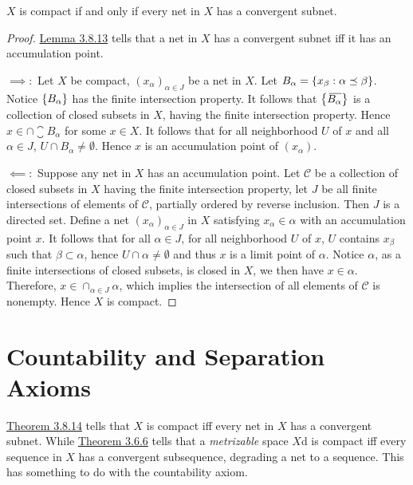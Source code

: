 \documentclass[12pt,a4paper]{article}
\begin{document}
    \begin{thm}\label{3.8.14}
        $X$ is compact if and only if every net in $X$ has a convergent subnet.
    \end{thm}
    \begin{proof}
        \hyperref[3.8.13]{Lemma 3.8.13} tells that a net in $X$ has a convergent subnet iff it has an accumulation point.
        
        $\implies:$ Let $X$ be compact, $(x_\alpha)_{\alpha\in J}$ be a net in $X$. Let $B_\alpha=\left\{x_\beta:\alpha\preceq\beta\right\}$. Notice $\left\{B_\alpha\right\}$ has the finite intersection property. It follows that $\left\{{}\mkern3mu\overline{\mkern-3muB_\alpha}\right\}$ is a collection of closed subsets in $X$, having the finite intersection property. Hence $x\in \cap \closure{B_\alpha}$ for some $x\in X$. It follows that for all neighborhood $U$ of $x$ and all $\alpha\in J$, $U\cap B_\alpha\neq\emptyset$. Hence $x$ is an accumulation point of $(x_\alpha)$.

        $\impliedby:$ Suppose any net in $X$ has an accumulation point. Let $\mathcal{C}$ be a collection of closed subsets in $X$ having the finite intersection property, let $J$ be all finite intersections of elements of $\mathcal{C}$, partially ordered by reverse inclusion. Then $J$ is a directed set. Define a net $(x_\alpha)_{\alpha\in J}$ in $X$ satisfying $x_\alpha\in \alpha$ with an accumulation point $x$. It follows that for all $\alpha\in J$, for all neighborhood $U$ of $x$, $U$ contains $x_\beta$ such that $\beta\subset \alpha$, hence $U\cap \alpha\neq\emptyset$ and thus $x$ is a limit point of $\alpha$. Notice $\alpha$, as a finite intersections of closed subsets, is closed in $X$, we then have $x\in \alpha$. Therefore, $x\in\cap_{\alpha\in J}\alpha$, which implies the intersection of all elements of $\mathcal{C}$ is nonempty. Hence $X$ is compact. 
    \end{proof}
    \hfill

    \newpage
    \section{Countability and Separation Axioms}
    \hfill


    \begin{note}
        \hyperref[3.8.14]{Theorem 3.8.14} tells that $X$ is compact iff every net in $X$ has a convergent subnet. While \hyperref[3.6.6]{Theorem 3.6.6} tells that a \textit{metrizable} space $X$d is compact iff every sequence in $X$ has a convergent subsequence, degrading a net to a sequence. This has something to do with the countability axiom.
    \end{note}
    \hfill
\end{document}
